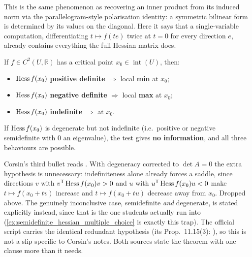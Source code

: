 \begin{remark}
This is the same phenomenon as recovering an inner product from its induced norm via the
parallelogram-style polarisation identity: a symmetric bilinear form is determined by its
values on the diagonal. Here it says that a single-variable computation, differentiating
$t\mapsto f(te)$ twice at $t=0$ for every direction $e$, already contains everything the full
Hessian matrix does.
\end{remark}

\begin{theorem}
\label{thm:hessian_test}
If $f \in C^2(U,\mathbb{R})$ has a critical point $x_0 \in \operatorname{int}(U)$, then:
\begin{itemize}
  \item $\operatorname{Hess} f(x_0)$ \textbf{positive definite} $\Rightarrow$ local \textbf{min} at $x_0$;
  \item $\operatorname{Hess} f(x_0)$ \textbf{negative definite} $\Rightarrow$ local \textbf{max} at $x_0$;
  \item $\operatorname{Hess} f(x_0)$ \textbf{indefinite} $\Rightarrow$ 
     at $x_0$.
\end{itemize}
If $\operatorname{Hess} f(x_0)$ is degenerate but not indefinite (i.e.\ positive or negative semidefinite with
$0$ an eigenvalue), the test gives \textbf{no information}, and all three behaviours are
possible.
\end{theorem}

\begin{ainote}
Corsin's third bullet reads . With degeneracy corrected to
$\det A = 0$ the extra hypothesis is unnecessary: indefiniteness alone already forces a saddle,
since directions $v$ with $v^{\mathsf{T}}\operatorname{Hess} f(x_0)v > 0$ and $u$ with $u^{\mathsf{T}}\operatorname{Hess} f(x_0)u < 0$
make $t\mapsto f(x_0+tv)$ increase and $t\mapsto f(x_0+tu)$ decrease away from $x_0$. Dropped
above. The genuinely inconclusive case, semidefinite \emph{and} degenerate, is stated explicitly
instead, since that is the one students actually run into (\cref{ex:semidefinite_hessian_multiple_choice} is exactly this trap).
The official script carries the identical redundant hypothesis (its Prop.\ 11.15(3):
), so this is not a slip specific to Corsin's notes. Both
sources state the theorem with one clause more than it needs.
\end{ainote}

